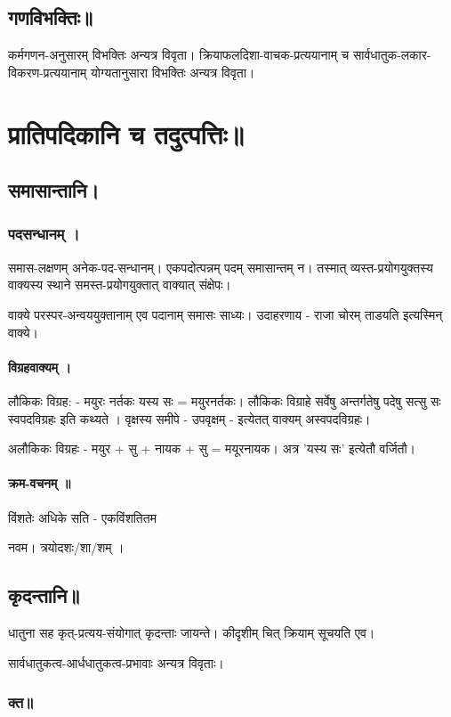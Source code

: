 \documentclass[oneside, article]{memoir}
\begin{document}
\section{गणविभक्तिः॥}
कर्मगणन-अनुसारम् विभक्तिः अन्यत्र विवृता। क्रियाफलदिशा-वाचक-प्रत्ययानाम् च सार्वधातुक-लकार-विकरण-प्रत्ययानाम् योग्यतानुसारा विभक्तिः अन्यत्र विवृता।

\chapter{प्रातिपदिकानि च तदुत्पत्तिः॥}
\section{समासान्तानि।}
\subsection{पदसन्धानम् ।}
समास-लक्षणम् अनेक-पद-सन्धानम्। एकपदोत्पन्नम् पदम् समासान्तम् न। तस्मात् व्यस्त-प्रयोगयुक्तस्य वाक्यस्य स्थाने समस्त-प्रयोगयुक्तात् वाक्यात् संक्षेपः।

वाक्ये परस्पर-अन्वययुक्तानाम् एव पदानाम् समासः साध्यः। उदाहरणाय  - राजा चोरम् ताडयति इत्यस्मिन् वाक्ये।

\subsubsection{विग्रहवाक्यम् ।}
लौकिकः विग्रह: - मयुरः नर्तकः यस्य सः = मयुरनर्तकः। लौकिकः विग्राहे सर्वेषु अन्तर्गतेषु पदेषु सत्सु सः स्वपदविग्रहः इति कथ्यते । वृक्षस्य समीपे - उपवृक्षम् - इत्येतत् वाक्यम् अस्वपदविग्रहः।

अलौकिकः विग्रहः - मयुर + सु + नायक + सु = मयूरनायक। अत्र 'यस्य सः' इत्येतौ वर्जितौ।

\subsubsection{क्रम-वचनम् ॥}
विंशतेः अधिके सति - एकविंशतितम

नवम। त्रयोदशः/शा/शम् ।

\section{कृदन्तानि॥}
धातुना सह कृत्-प्रत्यय-संयोगात् कृदन्ताः जायन्ते। कीदृशीम् चित् क्रियाम् सूचयति एव। 

सार्वधातुकत्व-आर्धधातुकत्व-प्रभावाः अन्यत्र विवृताः।

\subsection{क्त॥}
\end{document}
